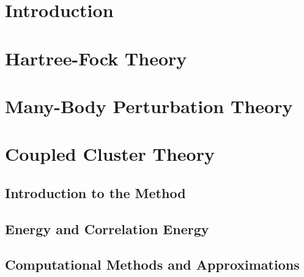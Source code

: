 \documentclass[12pt]{book}
\begin{document}
    \section{Introduction}
        

    \section{Hartree-Fock Theory}
        

    \section{Many-Body Perturbation Theory}
            

    \section{Coupled Cluster Theory}
        \subsection{Introduction to the Method}
            
        \subsection{Energy and Correlation Energy}
                        
        \subsection{Computational Methods and Approximations} 
            
\end{document}
